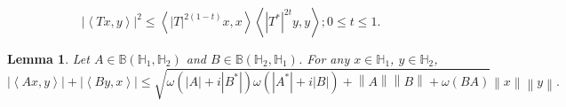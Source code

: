 \documentclass[10pt,a4paper]{amsart}
\newtheorem{lemma}{Lemma}
\begin{document}
\begin{equation}\label{eq_mixed_t}
{{\left| \left\langle Tx,y \right\rangle  \right|}^{2}}\le \left\langle {{\left| T \right|}^{2\left( 1-t \right)}}x,x \right\rangle \left\langle {{\left| {{T}^{*}} \right|}^{2t}}y,y \right\rangle; 0\leq t\leq 1.
\end{equation}

\begin{lemma}\label{2}
Let $A\in \mathbb B\left( {{\mathbb H}_{1}},{{\mathbb H}_{2}} \right)$ and $B\in \mathbb B\left( {{\mathbb H}_{2}},{{\mathbb H}_{1}} \right)$. For any $x\in {{\mathbb H}_{1}} $, $y\in {{\mathbb H}_{2}}$, 
\[\left| \left\langle Ax,y \right\rangle  \right|+\left| \left\langle By,x \right\rangle  \right|\le \sqrt{\omega \left( \left| A \right|+i\left| {{B}^{*}} \right| \right)\omega \left( \left| {{A}^{*}} \right|+i\left| B \right| \right)+\left\| A \right\|\left\| B \right\|+\omega \left( BA \right)}\left\| x \right\|\left\| y \right\|.\]
\end{lemma}
\end{document}
